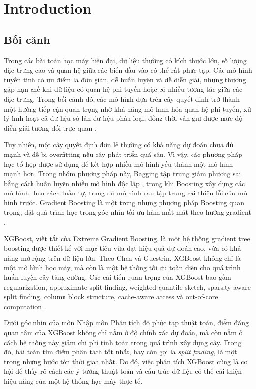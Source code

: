 \section{Introduction}

\subsection{Bối cảnh}

Trong các bài toán học máy hiện đại, dữ liệu thường có kích thước lớn, số lượng đặc trưng cao và quan hệ giữa các biến đầu vào có thể rất phức tạp. Các mô hình tuyến tính có ưu điểm là đơn giản, dễ huấn luyện và dễ diễn giải, nhưng thường gặp hạn chế khi dữ liệu có quan hệ phi tuyến hoặc có nhiều tương tác giữa các đặc trưng. Trong bối cảnh đó, các mô hình dựa trên cây quyết định trở thành một hướng tiếp cận quan trọng nhờ khả năng mô hình hóa quan hệ phi tuyến, xử lý linh hoạt cả dữ liệu số lẫn dữ liệu phân loại, đồng thời vẫn giữ được mức độ diễn giải tương đối trực quan \cite{breiman1984classification}.

Tuy nhiên, một cây quyết định đơn lẻ thường có khả năng dự đoán chưa đủ mạnh và dễ bị overfitting nếu cây phát triển quá sâu. Vì vậy, các phương pháp học tổ hợp được sử dụng để kết hợp nhiều mô hình yếu thành một mô hình mạnh hơn. Trong nhóm phương pháp này, Bagging tập trung giảm phương sai bằng cách huấn luyện nhiều mô hình độc lập \cite{breiman1996bagging}, trong khi Boosting xây dựng các mô hình theo cách tuần tự, trong đó mô hình sau tập trung cải thiện lỗi của mô hình trước. Gradient Boosting là một trong những phương pháp Boosting quan trọng, đặt quá trình học trong góc nhìn tối ưu hàm mất mát theo hướng gradient \cite{friedman2001gradient}.

XGBoost, viết tắt của Extreme Gradient Boosting, là một hệ thống gradient tree boosting được thiết kế với mục tiêu vừa đạt hiệu quả dự đoán cao, vừa có khả năng mở rộng trên dữ liệu lớn. Theo Chen và Guestrin, XGBoost không chỉ là một mô hình học máy, mà còn là một hệ thống tối ưu toàn diện cho quá trình huấn luyện cây tăng cường. Các cải tiến quan trọng của XGBoost bao gồm regularization, approximate split finding, weighted quantile sketch, sparsity-aware split finding, column block structure, cache-aware access và out-of-core computation \cite{chen2016xgboost}.

Dưới góc nhìn của môn Nhập môn Phân tích độ phức tạp thuật toán, điểm đáng quan tâm của XGBoost không chỉ nằm ở độ chính xác dự đoán, mà còn nằm ở cách hệ thống này giảm chi phí tính toán trong quá trình xây dựng cây. Trong đó, bài toán tìm điểm phân tách tốt nhất, hay còn gọi là \textit{split finding}, là một trong những bước tốn thời gian nhất. Do đó, việc phân tích XGBoost cũng là cơ hội để thấy rõ cách các ý tưởng thuật toán và cấu trúc dữ liệu có thể cải thiện hiệu năng của một hệ thống học máy thực tế.

